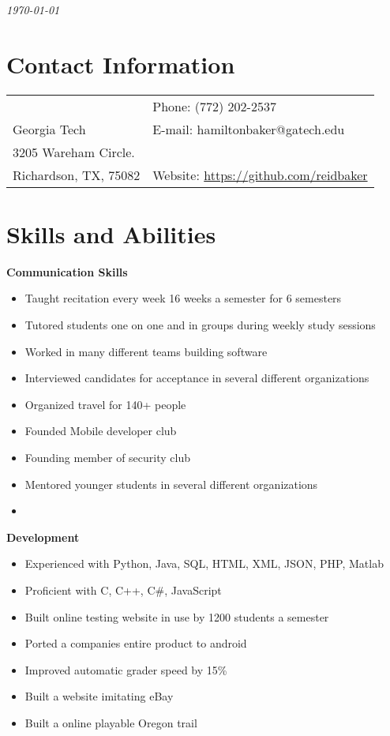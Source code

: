 \documentclass[margin,line]{res}
\begin{document}
 \hfill {\em \today}

\begin{resume}
\section{\sc Contact Information}

\vspace{.05in}
\begin{tabular}{@{}p{3.5in}p{3in}} & {Phone:}  (772) 202-2537 \\
Georgia Tech & {E-mail:}  hamiltonbaker@gatech.edu\\
3205 Wareham Circle. \\
Richardson, TX, 75082  & {Website:} \url{https://github.com/reidbaker}
\end{tabular}
 
\section{\sc Skills and Abilities}
    {\bf Communication Skills}
    \begin{itemize}
    \item Taught recitation every week 16 weeks a semester for 6 semesters
    \item Tutored students one on one and in groups during weekly
      study sessions
    \item Worked in many different teams building software
    \item Interviewed candidates for acceptance in several
      different organizations
    \item Organized travel for 140+ people
    \item Founded Mobile developer club
    \item Founding member of security club
    \item Mentored younger students in several different
      organizations
    \item
    \end{itemize}
 {\bf Development}
    \begin{itemize}
    \item Experienced with Python, Java, SQL, HTML, XML, JSON,
      PHP, Matlab
    \item Proficient with C, C++, C\#, JavaScript
    \item Built online testing website in use by 1200 students a
      semester
    \item Ported a companies entire product to android
    \item Improved automatic grader speed by 15\%
    \item Built a website imitating eBay
    \item Built a online playable Oregon trail
    \end{itemize}


\end{resume}
\end{document}
